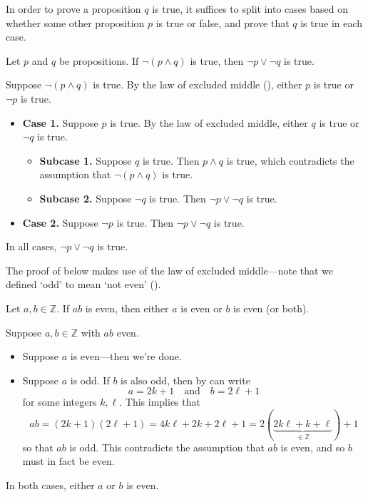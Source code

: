 \begin{strategy}
\label{strLEM}
In order to prove a proposition $q$ is true, it suffices to split into cases based on whether some other proposition $p$ is true or false, and prove that $q$ is true in each case.
\end{strategy}

\begin{example}
Let $p$ and $q$ be propositions. If $\neg(p \wedge q)$ is true, then $\neg p \vee \neg q$ is true.

Suppose $\neg(p \wedge q)$ is true. By the law of excluded middle (), either $p$ is true or $\neg p$ is true.
\begin{itemize}
  \item \textbf{Case 1.} Suppose $p$ is true. By the law of excluded middle, either $q$ is true or $\neg q$ is true.
  \begin{itemize}
    \item \textbf{Subcase 1.} Suppose $q$ is true. Then $p \wedge q$ is true, which contradicts the assumption that $\neg(p \wedge q)$ is true.
    \item \textbf{Subcase 2.} Suppose $\neg q$ is true. Then $\neg p \vee \neg q$ is true.
  \end{itemize}
  \item \textbf{Case 2.} Suppose $\neg p$ is true. Then $\neg p \vee \neg q$ is true.
\end{itemize}
In all cases, $\neg p \vee \neg q$ is true.
\end{example}




The proof of  below makes use of the law of excluded middle---note that we defined `odd' to mean `not even' ().

\begin{proposition}
\label{propIfProductEvenThenSomeFactorEven}
Let $a,b \in \mathbb{Z}$. If $ab$ is even, then either $a$ is even or $b$ is even (or both).
\end{proposition}
\begin{cproof}
Suppose $a,b \in \mathbb{Z}$ with $ab$ even.
\begin{itemize}
\item Suppose $a$ is even---then we're done.
\item Suppose $a$ is odd. If $b$ is also odd, then by  can write
\[
a = 2k+1 \quad \text{and} \quad b=2\ell+1
\]
for some integers $k,\ell$. This implies that
\[
ab = (2k+1)(2\ell+1) = 4k\ell + 2k + 2\ell + 1 = 2(\underbrace{2k\ell + k + \ell}_{\in \mathbb{Z}}) + 1
\]
so that $ab$ is odd. This contradicts the assumption that $ab$ is even, and so $b$ must in fact be even.
\end{itemize}
In both cases, either $a$ or $b$ is even.
\end{cproof}

